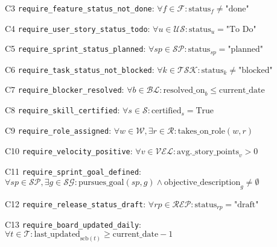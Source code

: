 \documentclass[12pt]{article}
\begin{document}
    \item[C3] \texttt{require\_feature\_status\_not\_done}: 
    $\forall f \in \mathcal{F}: \text{status}_f \neq \text{"done"}$
    
    \item[C4] \texttt{require\_user\_story\_status\_todo}: 
    $\forall u \in \mathcal{US}: \text{status}_u = \text{"To Do"}$
    
    \item[C5] \texttt{require\_sprint\_status\_planned}: 
    $\forall sp \in \mathcal{SP}: \text{status}_{sp} = \text{"planned"}$
    
    \item[C6] \texttt{require\_task\_status\_not\_blocked}: 
    $\forall k \in \mathcal{TSK}: \text{status}_k \neq \text{"blocked"}$
    
    \item[C7] \texttt{require\_blocker\_resolved}: 
    $\forall b \in \mathcal{BL}: \text{resolved\_on}_b \leq \text{current\_date}$
    
    \item[C8] \texttt{require\_skill\_certified}: 
    $\forall s \in \mathcal{S}: \text{certified}_s = \text{True}$
    
    \item[C9] \texttt{require\_role\_assigned}: 
    $\forall w \in \mathcal{W}, \exists r \in \mathcal{R}: \text{takes\_on\_role}(w,r)$
    
    \item[C10] \texttt{require\_velocity\_positive}: 
    $\forall v \in \mathcal{VEL}: \text{avg.\_story\_points}_v > 0$
    
    \item[C11] \texttt{require\_sprint\_goal\_defined}: 
    $\forall sp \in \mathcal{SP}, \exists g \in \mathcal{SG}: \text{pursues\_goal}(sp,g) \land \text{objective\_description}_g \neq \emptyset$
    
    \item[C12] \texttt{require\_release\_status\_draft}: 
    $\forall rp \in \mathcal{REP}: \text{status}_{rp} = \text{"draft"}$
    
    \item[C13] \texttt{require\_board\_updated\_daily}: 
    $\forall t \in \mathcal{T}: \text{last\_updated}_{\text{scb}(t)} \geq \text{current\_date} - 1$
\end{document}
